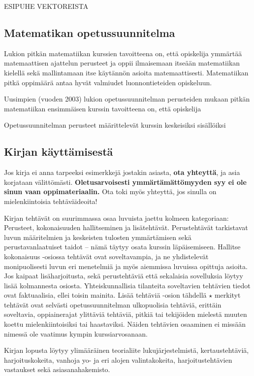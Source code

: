 ESIPUHE VEKTOREISTA

\newpage
\subsection*{Matematikan opetussuunnitelma}

Lukion pitkän matematiikan kurssien tavoitteena on, että opiskelija ymmärtää matemaattisen ajattelun perusteet ja oppii ilmaisemaan itseään matematiikan kielellä sekä mallintamaan itse käytännön asioita matemaattisesti. Matematiikan pitkä oppimäärä antaa hyvät valmiudet luonnontieteiden opiskeluun.

Uusimpien (vuoden 2003) lukion opetussuunnitelman perusteiden mukaan pitkän matematiikan ensimmäisen kurssin tavoitteena on, että opiskelija

Opetussuunnitelman perusteet määrittelevät kurssin keskeisiksi sisällöiksi


\newpage

\subsection*{Kirjan käyttämisestä}

Jos kirja ei anna tarpeeksi esimerkkejä jostakin asiasta, \textbf{ota yhteyttä}, ja asia korjataan välittömästi. \textbf{Oletusarvoisesti ymmärtämättömyyden syy ei ole sinun vaan oppimateriaalin.} Ota toki myös yhteyttä, jos sinulla on mielenkiintoisia tehtäväideoita!

Kirjan tehtävät on suurimmassa osaa luvuista jaettu kolmeen kategoriaan: Perusteet, kokonaisuuden hallitseminen ja lisätehtävät. Perustehtävät tarkistavat luvun määritelmien ja keskeisten tulosten ymmärtämisen sekä perustavanlaatuiset taidot -- nämä täytyy osata kurssin läpäisemiseen. Hallitse kokonaisuus -osiossa tehtävät ovat soveltavampia, ja ne yhdistelevät monipuolisesti luvun eri menetelmiä ja myös aiemmissa luvuissa opittuja asioita. Jos kaipaat lisäharjoitusta, sekä perustehtäviä että sekalaisia sovelluksia löytyy lisää kolmannesta osiosta. Yhteiskunnallisia tilanteita soveltavien tehtävien tiedot ovat faktuaalisia, ellei toisin mainita. Lisää tehtäviä -osion tähdellä $\star$ merkityt tehtävät ovat selvästi opetussuunnitelman ulkopuolisia tehtäviä, erittäin soveltavia, oppiainerajat ylittäviä tehtäviä, pitkiä tai tekijöiden mielestä muuten koettu mielenkiintoisiksi tai haastaviksi. Näiden tehtävien osaaminen ei missään nimessä ole vaatimus kympin kurssiarvosanaan.

Kirjan lopusta löytyy ylimääräinen teorialiite lukujärjestelmistä, kertaustehtäviä, harjoituskokeita, vanhoja yo- ja eri alojen valintakokeita, harjoitustehtävien vastaukset sekä asiasanahakemisto.

\newpage